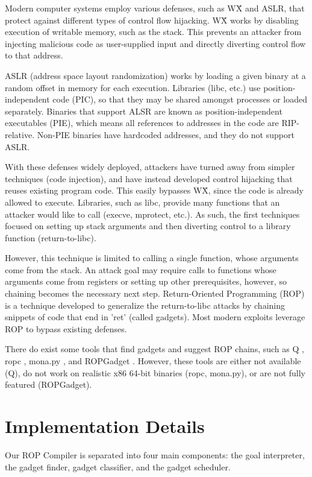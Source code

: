\documentclass[journal]{IEEEtran}
\begin{document}
Modern computer systems employ various defenses, such as W\^X and ASLR, that
protect against different types of control flow hijacking. W\^X works by
disabling execution of writable memory, such as the stack. This prevents an
attacker from injecting malicious code as user-supplied input and directly
diverting control flow to that address.

ASLR (address space layout randomization) works by loading a given binary at a random offset in memory for
each execution. Libraries (libc, etc.) use position-independent code (PIC),
so that they may be shared amongst processes or loaded separately. Binaries that
support ALSR are known as position-independent executables (PIE), which means
all references to addresses in the code are RIP-relative. Non-PIE binaries have
hardcoded addresses, and they do not support ASLR.



With these defenses widely deployed, attackers have turned away from simpler
techniques (code injection), and have instead developed control hijacking that
reuses existing program code. This easily bypasses W\^X, since the code is
already allowed to execute. Libraries, such as libc, provide many functions that
an attacker would like to call (execve, mprotect, etc.). As such, the first
techniques focused on setting up stack arguments and then diverting control to a
library function (return-to-libc).

However, this technique is limited to calling a single function, whose arguments
come from the stack. An attack goal may require calls to functions whose
arguments come from registers or setting up other prerequisites, however, so
chaining becomes the necessary next step. Return-Oriented Programming (ROP) \cite{rop} is a
technique developed to generalize the return-to-libc attacks by chaining
snippets of code that end in 'ret' (called gadgets). Most modern exploits leverage ROP to bypass existing defenses.

There do exist some tools that find gadgets and suggest ROP chains, such as Q \cite{schwartz2011q},
ropc \cite{ropc}, mona.py \cite{mona}, and ROPGadget \cite{ropgadget}. However, these tools are either not available (Q),
do not work on realistic x86 64-bit binaries (ropc, mona.py), or are not fully
featured (ROPGadget).


\section{Implementation Details}
Our ROP Compiler is separated into four main components: the goal interpreter, the gadget finder, gadget classifier, and the gadget scheduler.
\end{document}
